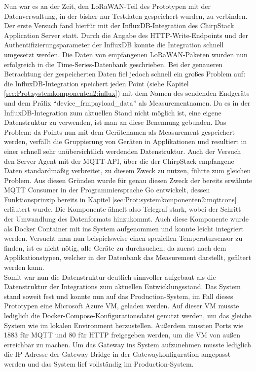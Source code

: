 Nun war es an der Zeit, den LoRaWAN-Teil des Prototypen mit der Datenverwaltung, in der bisher nur Testdaten gespeichert wurden, zu verbinden. Der erste Versuch fand hierfür mit der InfluxDB-Integration des ChirpStack Application Server statt. Durch die Angabe des HTTP-Write-Endpoints und der Authentifizierungsparameter der InfluxDB konnte die Integration schnell umgesetzt werden. Die Daten von empfangenen LoRaWAN-Paketen wurden nun erfolgreich in die Time-Series-Datenbank geschrieben. Bei der genaueren Betrachtung der gespeicherten Daten fiel jedoch schnell ein großes Problem auf: die InfluxDB-Integration speichert jeden Point (siehe Kapitel \ref{sec:Prot:systemkomponenten2:influx}) mit dem Namen des sendenden Endgeräts und dem Präfix \mbox{``device\_frmpayload\_data''} als Measurementnamen. Da es in der InfluxDB-Integration zum aktuellen Stand nicht möglich ist, eine eigene Datenstruktur zu verwenden, ist man an diese Benennung gebunden. Das Problem: da Points nun mit dem Gerätenamen als Measurement gespeichert werden, verfällt die Gruppierung von Geräten in Applikationen und resultiert in einer schnell sehr unübersichtlich werdenden Datenstruktur. Auch der Versuch den Server Agent  mit der MQTT-API, über die der ChirpStack empfangene Daten standardmäßig verbreitet, zu diesem Zweck zu nutzen, führte zum gleichen Problem. Aus diesen Gründen wurde für genau diesen Zweck der bereits erwähnte MQTT Consumer in der Programmiersprache Go entwickelt, dessen Funktionsprinzip bereits in Kapitel \ref{sec:Prot:systemkomponenten2:mqttcons} erläutert wurde. Die Komponente ähnelt also Telegraf stark, wobei der Schritt der Umwandlung des Datenformats hinzukommt. Auch diese Komponente wurde als \mbox{Docker} Container mit ins System aufgenommen und konnte leicht integriert werden. Versucht man nun beispielsweise einen speziellen Temperatursensor zu finden, ist es nicht nötig, alle Geräte zu durchsuchen, da zuerst nach dem Applikationstypen, welcher in der Datenbank das Measurement darstellt, gefiltert werden kann.\\
Somit war nun die Datenstruktur deutlich sinnvoller aufgebaut als die Datenstruktur der Integrations zum aktuellen Entwicklungsstand. Das System stand soweit fest und konnte nun auf das Production-System, im Fall dieses Prototypen eine Microsoft Azure VM, geladen werden. Auf dieser VM musste lediglich die Docker-Compose-Konfigurationsdatei genutzt werden, um das gleiche System wie im lokalen Environment herzustellen. Außerdem mussten Ports wie 1883 für MQTT und 80 für HTTP freigegeben werden, um die VM von außen erreichbar zu machen. Um das Gateway ins System aufzunehmen musste lediglich die IP-Adresse der Gateway Bridge in der Gatewaykonfiguration angepasst werden und das System lief vollständig im Production-System.

